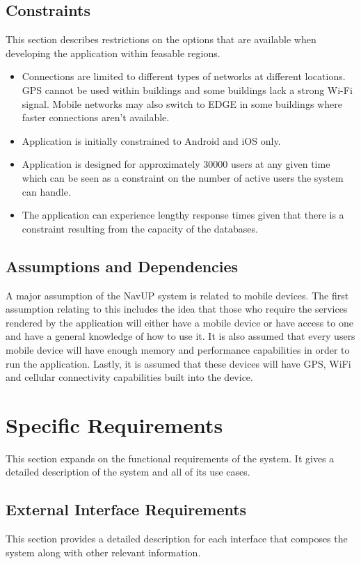 \documentclass{article}
\begin{document}
	\subsection{Constraints}
		This section describes restrictions on the options that are available when developing the application within feasable regions.
 		\begin{itemize}
 			\item Connections are limited to different types of networks at different locations. GPS cannot be used within buildings and some buildings lack a strong Wi-Fi signal. Mobile networks may also switch to EDGE in some buildings where faster connections aren't available.
 			\item Application is initially constrained to Android and iOS only.
 			\item Application is designed for approximately 30000 users at any given time which can be seen as a constraint on the number of active users the system can handle.
 			\item The application can experience lengthy response times given that there is a constraint resulting from the capacity of the databases.\newline
 		\end{itemize}
 
	\subsection{Assumptions and Dependencies}
	A major assumption of the NavUP system is related to mobile devices. The first assumption relating to this includes the idea that those who require the services rendered by the application will either have a mobile device or have access to one and have a general knowledge of how to use it. It is also assumed that every users mobile device will have enough memory and performance capabilities in order to run the application. Lastly, it is assumed that these devices will have GPS, WiFi and cellular connectivity capabilities built into the device.
	
	\section{Specific Requirements}
	This section expands on the functional requirements of the system. It gives a detailed 	description of the system and all of its use cases.
	
	\subsection{External Interface Requirements}
		This section provides a detailed description for each interface that composes the system along with other relevant information.
\end{document}
